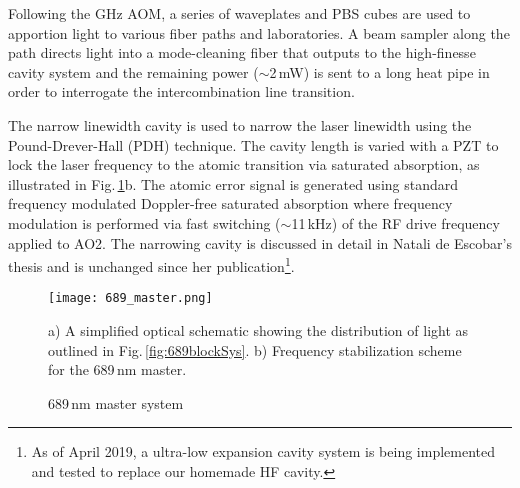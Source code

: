 Following the GHz AOM, a series of waveplates and PBS cubes are used to apportion light to various fiber paths and laboratories.
A beam sampler along the path directs light into a mode-cleaning fiber that outputs to the high-finesse cavity system and the remaining power ($\sim$2\,mW) is sent to a long heat pipe in order to interrogate the intercombination line transition.

The narrow linewidth cavity is used to narrow the laser linewidth using the Pound-Drever-Hall (PDH) technique.
The cavity length is varied with a PZT to lock the laser frequency to the atomic transition via saturated absorption, as illustrated in Fig.\,\ref{fig:689master}b.
The atomic error signal is generated using standard frequency modulated Doppler-free saturated absorption where frequency modulation is performed via fast switching ($\sim$11\,kHz) of the RF drive frequency applied to AO2.
The narrowing cavity is discussed in detail in Natali de Escobar's thesis and is unchanged since her publication\footnote{As of April 2019, a ultra-low expansion cavity system is being implemented and tested to replace our homemade HF cavity.}.
%
	\begin{figure} 
		\centerline{
		\texttt{[image: 689\_master.png]}}
		\caption{689\,nm master system}{a) A simplified optical schematic showing the distribution of light as outlined in Fig.\,\ref{fig:689blockSys}. b) Frequency stabilization scheme for the 689\,nm master.}
		\label{fig:689master}
	\end{figure}





